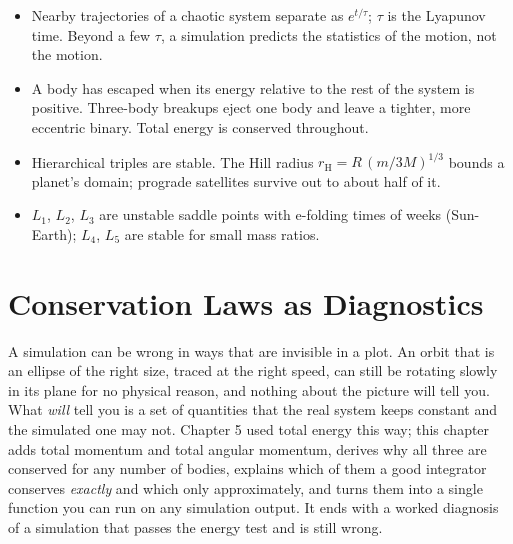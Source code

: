 \documentclass[
  10.5pt,
  letterpaper,
]{scrbook}
\providecommand{\tightlist}{%
  \setlength{\itemsep}{0pt}\setlength{\parskip}{0pt}}
\theoremstyle{plain}
\theoremstyle{remark}
\begin{document}
\begin{tcolorbox}[enhanced jigsaw, arc=.35mm, bottomrule=.15mm, bottomtitle=1mm, breakable, colback=white, colbacktitle=quarto-callout-tip-color!10!white, colframe=quarto-callout-tip-color-frame, coltitle=black, left=2mm, leftrule=.75mm, opacityback=0, opacitybacktitle=0.6, rightrule=.15mm, title={Key results}, titlerule=0mm, toprule=.15mm, toptitle=1mm]

\begin{itemize}
\tightlist
\item
  Nearby trajectories of a chaotic system separate as \(e^{t/\tau}\);
  \(\tau\) is the Lyapunov time. Beyond a few \(\tau\), a simulation
  predicts the statistics of the motion, not the motion.
\item
  A body has escaped when its energy relative to the rest of the system
  is positive. Three-body breakups eject one body and leave a tighter,
  more eccentric binary. Total energy is conserved throughout.
\item
  Hierarchical triples are stable. The Hill radius
  \(r_{\mathrm{H}} = R\,(m/3M)^{1/3}\) bounds a planet's domain;
  prograde satellites survive out to about half of it.
\item
  \(L_1\), \(L_2\), \(L_3\) are unstable saddle points with e-folding
  times of weeks (Sun-Earth); \(L_4\), \(L_5\) are stable for small mass
  ratios.
\end{itemize}

\end{tcolorbox}

\chapter{Conservation Laws as Diagnostics}\label{sec-diagnostics}

A simulation can be wrong in ways that are invisible in a plot. An orbit
that is an ellipse of the right size, traced at the right speed, can
still be rotating slowly in its plane for no physical reason, and
nothing about the picture will tell you. What \emph{will} tell you is a
set of quantities that the real system keeps constant and the simulated
one may not. Chapter 5 used total energy this way; this chapter adds
total momentum and total angular momentum, derives why all three are
conserved for any number of bodies, explains which of them a good
integrator conserves \emph{exactly} and which only approximately, and
turns them into a single function you can run on any simulation output.
It ends with a worked diagnosis of a simulation that passes the energy
test and is still wrong.
\end{document}

